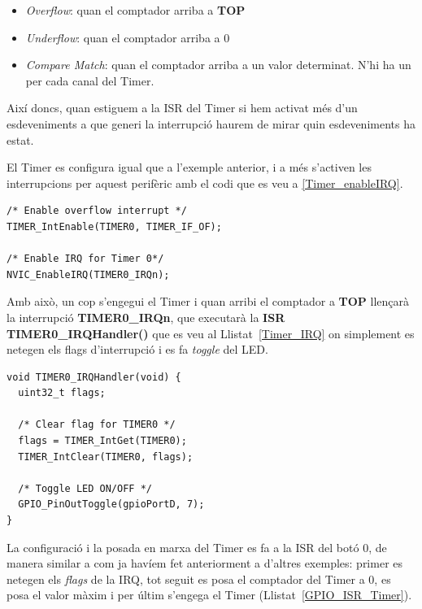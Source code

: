 \begin{itemize}
 \item {\em Overflow}: quan el comptador arriba a {\bf TOP}
 \item {\em Underflow}: quan el comptador arriba a 0
 \item {\em Compare Match}: quan el comptador arriba a un valor determinat. N'hi ha un per cada canal del Timer.
\end{itemize}

Així doncs, quan estiguem a la \gls{ISR} del Timer si hem activat més d'un esdeveniments a que generi la interrupció haurem de mirar quin esdeveniments ha estat.

El Timer es configura igual que a l'exemple anterior, i a més s'activen les interrupcions per aquest perifèric amb el codi que es veu a \ref{Timer_enableIRQ}.
\begin{lstlisting}[style=customc, label=Timer_enableIRQ, caption=Codi corresponent a l'activació de les IRQs del Timer]
 /* Enable overflow interrupt */
TIMER_IntEnable(TIMER0, TIMER_IF_OF);

/* Enable IRQ for Timer 0*/
NVIC_EnableIRQ(TIMER0_IRQn);
\end{lstlisting}

Amb això, un cop s'engegui el Timer i quan arribi el comptador a {\bf TOP} llençarà la interrupció {\bf TIMER0\_IRQn}, que executarà la {\bf ISR TIMER0\_IRQHandler()} que es veu al Llistat~\ref{Timer_IRQ} on simplement es netegen els \glspl{flag} d'interrupció i es fa {\em toggle} del \gls{LED}.
\begin{lstlisting}[style=customc, label=Timer_IRQ, caption=ISR del Timer]
void TIMER0_IRQHandler(void) {
  uint32_t flags;

  /* Clear flag for TIMER0 */
  flags = TIMER_IntGet(TIMER0);
  TIMER_IntClear(TIMER0, flags);

  /* Toggle LED ON/OFF */
  GPIO_PinOutToggle(gpioPortD, 7);
}
\end{lstlisting}

La configuració i la posada en marxa del Timer es fa a la \gls{ISR} del botó 0, de manera similar a com ja havíem fet anteriorment a d'altres exemples: primer es netegen els {\em flags} de la \gls{IRQ}, tot seguit es posa el comptador del Timer a 0, es posa el valor màxim i per últim s'engega el Timer (Llistat~\ref{GPIO_ISR_Timer}).

